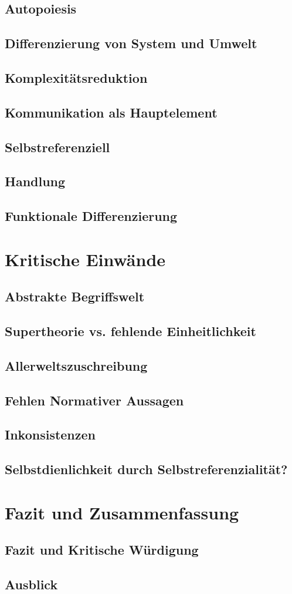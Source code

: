 \documentclass[a4paper,12pt]{article}
\begin{document}
\subsection{Autopoiesis}
\subsection{Differenzierung von System und Umwelt}
\subsection{Komplexitätsreduktion}
\subsection{Kommunikation als Hauptelement}
\subsection{Selbstreferenziell}
\subsection{Handlung}
\subsection{Funktionale Differenzierung}

\section{Kritische Einwände}
\subsection{Abstrakte Begriffswelt}
\subsection{Supertheorie vs. fehlende Einheitlichkeit}
\subsection{Allerweltszuschreibung}
\subsection{Fehlen Normativer Aussagen}
\subsection{Inkonsistenzen}
\subsection{Selbstdienlichkeit durch Selbstreferenzialität?}
\newpage

\section{Fazit und Zusammenfassung}
\subsection{Fazit und Kritische Würdigung}
\subsection{Ausblick}


\newpage

\nocite{*}
\printbibliography
% 
%
\end{document}
